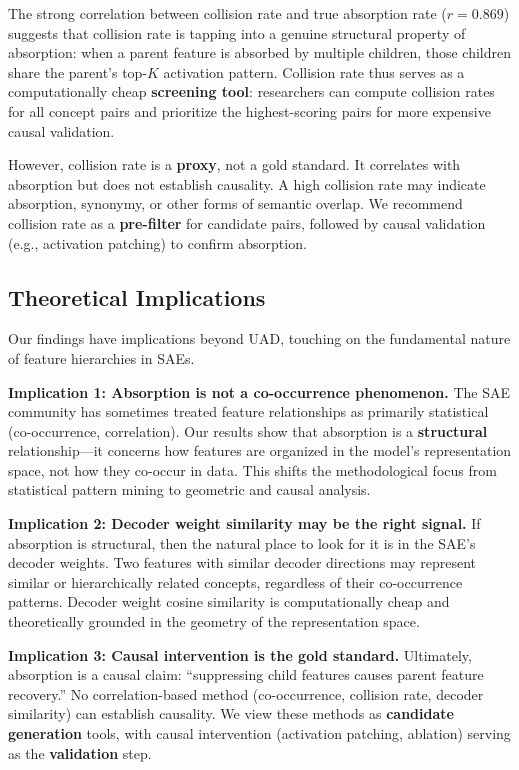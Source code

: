 \documentclass{article}
\begin{document}
The strong correlation between collision rate and true absorption rate ($r = 0.869$) suggests that collision rate is tapping into a genuine structural property of absorption: when a parent feature is absorbed by multiple children, those children share the parent's top-$K$ activation pattern. Collision rate thus serves as a computationally cheap \textbf{screening tool}: researchers can compute collision rates for all concept pairs and prioritize the highest-scoring pairs for more expensive causal validation.

However, collision rate is a \textbf{proxy}, not a gold standard. It correlates with absorption but does not establish causality. A high collision rate may indicate absorption, synonymy, or other forms of semantic overlap. We recommend collision rate as a \textbf{pre-filter} for candidate pairs, followed by causal validation (e.g., activation patching) to confirm absorption.

\subsection{Theoretical Implications}

Our findings have implications beyond UAD, touching on the fundamental nature of feature hierarchies in SAEs.

\textbf{Implication 1: Absorption is not a co-occurrence phenomenon.}
The SAE community has sometimes treated feature relationships as primarily statistical (co-occurrence, correlation). Our results show that absorption is a \textbf{structural} relationship---it concerns how features are organized in the model's representation space, not how they co-occur in data. This shifts the methodological focus from statistical pattern mining to geometric and causal analysis.

\textbf{Implication 2: Decoder weight similarity may be the right signal.}
If absorption is structural, then the natural place to look for it is in the SAE's decoder weights. Two features with similar decoder directions may represent similar or hierarchically related concepts, regardless of their co-occurrence patterns. Decoder weight cosine similarity is computationally cheap and theoretically grounded in the geometry of the representation space.

\textbf{Implication 3: Causal intervention is the gold standard.}
Ultimately, absorption is a causal claim: ``suppressing child features causes parent feature recovery.'' No correlation-based method (co-occurrence, collision rate, decoder similarity) can establish causality. We view these methods as \textbf{candidate generation} tools, with causal intervention (activation patching, ablation) serving as the \textbf{validation} step.
\end{document}
